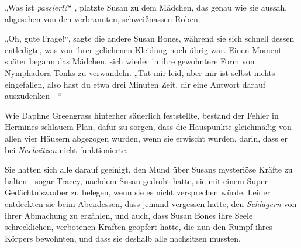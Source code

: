 \later

„Was ist \emph{passiert}?“ , platzte Susan zu dem Mädchen, das genau wie sie aussah, abgesehen von den verbrannten, schweißnassen Roben.

„Oh, gute Frage!“, sagte die andere Susan Bones, während sie sich schnell dessen entledigte, was von ihrer geliehenen Kleidung noch übrig war. Einen Moment später begann das Mädchen, sich wieder in ihre gewohntere Form von Nymphadora Tonks zu verwandeln. „Tut mir leid, aber mir ist selbst nichts eingefallen, also hast du etwa drei Minuten Zeit, dir eine Antwort darauf auszudenken—“

\later

Wie Daphne Greengrass hinterher säuerlich feststellte, bestand der Fehler in Hermines schlauem Plan, dafür zu sorgen, dass die Hauspunkte gleichmäßig von allen vier Häusern abgezogen wurden, wenn sie erwischt wurden, darin, dass er bei \emph{Nachsitzen} nicht funktionierte.

Sie hatten sich alle darauf geeinigt, den Mund über Susans mysteriöse Kräfte zu halten—sogar Tracey, nachdem Susan gedroht hatte, sie mit einem Super-Gedächtniszauber zu belegen, wenn sie es nicht versprechen würde. Leider entdeckten sie beim Abendessen, dass jemand vergessen hatte, den \emph{Schlägern} von ihrer Abmachung zu erzählen, und auch, dass Susan Bones ihre Seele schrecklichen, verbotenen Kräften geopfert hatte, die nun den Rumpf ihres Körpers bewohnten, und dass sie deshalb alle nachsitzen mussten.

